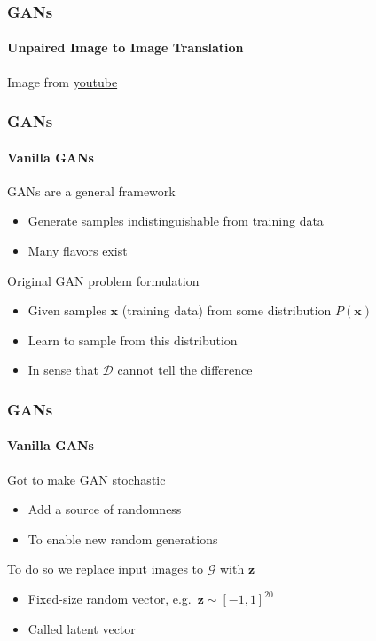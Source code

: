 \documentclass[xetex,professionalfont]{beamer}
\renewcommand\emph[1]{\textcolor{tuwcvl_cvl_blue}{#1}}
\renewcommand{\vec}[1]{\ensuremath{\mathbf{#1}}}
\newcommand{\vx}{\vec{x}}
\newcommand{\vz}{\vec{z}}
\newcommand{\cD}{\mathcal{D}}
\newcommand{\cG}{\mathcal{G}}
\begin{document}
\begin{frame}
	\frametitle{GANs}
	\framesubtitle{Unpaired Image to Image Translation}

	\begin{center}
		{\centering Image from \href{https://www.youtube.com/watch?v=lCR9sT9mbis&t=14s}{youtube}}
	\end{center}

\end{frame}


\begin{frame}
	\frametitle{GANs}
	\framesubtitle{Vanilla GANs}

	GANs are a general framework
	\begin{itemize}
		\item Generate samples indistinguishable from training data
		\item Many flavors exist
	\end{itemize}

	\bigskip

	Original GAN problem formulation
	\begin{itemize}
		\item Given samples $\vx$ (training data) from some distribution $P(\vx)$
		\item Learn to sample from this distribution
		\item In sense that $\cD$ cannot tell the difference
	\end{itemize}

\end{frame}


\begin{frame}
	\frametitle{GANs}
	\framesubtitle{Vanilla GANs}

	Got to make GAN stochastic %
	\begin{itemize}
		\item Add a source of randomness
		\item To enable new random generations
	\end{itemize}

	\bigskip

	To do so we replace input images to $\cG$ with $\vz$
	\begin{itemize}
		\item Fixed-size random vector, e.g.~$\vz\sim[-1,1]^{20}$ %
		\item Called \emph{latent vector}
	\end{itemize}

\end{frame}
\end{document}
